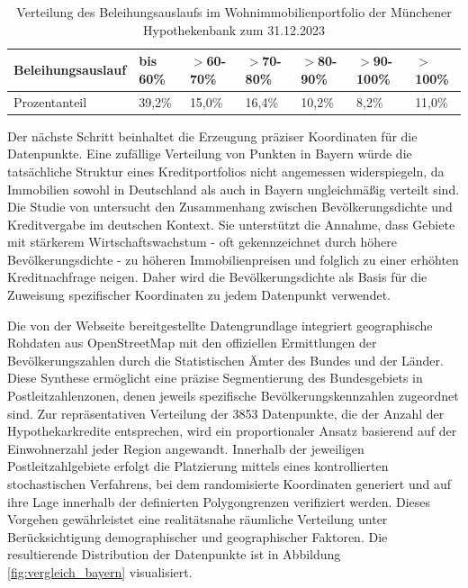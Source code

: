 \begin{table}[htbp]
    \centering
    \caption{Verteilung des Beleihungsauslaufs im Wohnimmobilienportfolio der Münchener Hypothekenbank zum 31.12.2023}
    \label{tab:beleihungsauslauf2023}
    \begin{tabularx}{\textwidth}{XXXXXXX}
    \toprule
    Beleihungsauslauf & bis 60\% & $>$60-70\% & $>$70-80\% & $>$80-90\% & $>$90-100\% & $>$100\% \\
    \midrule
    Prozentanteil & 39,2\% & 15,0\% & 16,4\% & 10,2\% & 8,2\% & 11,0\% \\
    \bottomrule
    \end{tabularx}
\end{table}

Der nächste Schritt beinhaltet die Erzeugung präziser Koordinaten für die Datenpunkte. Eine zufällige Verteilung von Punkten in Bayern würde die tatsächliche Struktur eines Kreditportfolios nicht angemessen widerspiegeln, da Immobilien sowohl in Deutschland als auch in Bayern ungleichmäßig verteilt sind. Die Studie von \textcite{zurek2022real} untersucht den Zusammenhang zwischen Bevölkerungsdichte und Kreditvergabe im deutschen Kontext. Sie unterstützt die Annahme, dass Gebiete mit stärkerem Wirtschaftswachstum - oft gekennzeichnet durch höhere Bevölkerungsdichte - zu höheren Immobilienpreisen und folglich zu einer erhöhten Kreditnachfrage neigen. Daher wird die Bevölkerungsdichte als Basis für die Zuweisung spezifischer Koordinaten zu jedem Datenpunkt verwendet.

Die von der Webseite \parencite{suche_postleitzahl} bereitgestellte Datengrundlage integriert geographische Rohdaten aus OpenStreetMap mit den offiziellen Ermittlungen der Bevölkerungszahlen durch die Statistischen Ämter des Bundes und der Länder. Diese Synthese ermöglicht eine präzise Segmentierung des Bundesgebiets in Postleitzahlenzonen, denen jeweils spezifische Bevölkerungskennzahlen zugeordnet sind.
Zur repräsentativen Verteilung der 3853 Datenpunkte, die der Anzahl der Hypothekarkredite entsprechen, wird ein proportionaler Ansatz basierend auf der Einwohnerzahl jeder Region angewandt. Innerhalb der jeweiligen Postleitzahlgebiete erfolgt die Platzierung mittels eines kontrollierten stochastischen Verfahrens, bei dem randomisierte Koordinaten generiert und auf ihre Lage innerhalb der definierten Polygongrenzen verifiziert werden. Dieses Vorgehen gewährleistet eine realitätsnahe räumliche Verteilung unter Berücksichtigung demographischer und geographischer Faktoren. Die resultierende Distribution der Datenpunkte ist in Abbildung \ref{fig:vergleich_bayern} visualisiert.

